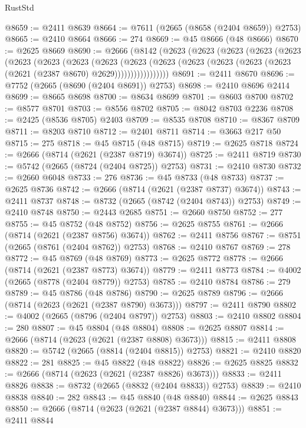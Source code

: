 \begin{lexlean}{RustStd}
\begin{coremodule}
@8659 := @2411 @8639
@8664 := @7611 (@2665 (@8658 (@2404 @8659)) @2753)
@8665 := @2410 @8664
@8666 := 274
@8669 := @45 @8666 (@48 @8666)
@8670 := @2625 @8669
@8690 := @2666
    (@8142
      (@2623
        (@2623
          (@2623
            (@2623
              (@2623
                (@2623
                  (@2623
                    (@2623
                      (@2623
                        (@2623
                          (@2623
                            (@2623 (@2623 (@2623 (@2623 (@2621 (@2387 @8670) @2629)))))))))))))))))
@8691 := @2411 @8670
@8696 := @7752 (@2665 (@8690 (@2404 @8691)) @2753)
@8698 := @2410 @8696 @2414
@8699 := @8665 @8698
@8700 := @8634 @8699
@8701 := @8603 @8700
@8702 := @8577 @8701
@8703 := @8556 @8702
@8705 := @8042 @8703 @2236
@8708 := @2425 (@8536 @8705) @2403
@8709 := @8535 @8708
@8710 := @8367 @8709
@8711 := @8203 @8710
@8712 := @2401 @8711
@8714 := @3663 @217 @50
@8715 := 275
@8718 := @45 @8715 (@48 @8715)
@8719 := @2625 @8718
@8724 := @2666 (@8714 (@2621 (@2387 @8719) @3674))
@8725 := @2411 @8719
@8730 := @5742 (@2665 (@8724 (@2404 @8725)) @2753)
@8731 := @2410 @8730
@8732 := @2660 @6048
@8733 := 276
@8736 := @45 @8733 (@48 @8733)
@8737 := @2625 @8736
@8742 := @2666 (@8714 (@2621 (@2387 @8737) @3674))
@8743 := @2411 @8737
@8748 := @8732 (@2665 (@8742 (@2404 @8743)) @2753)
@8749 := @2410 @8748
@8750 := @2443 @2685
@8751 := @2660 @8750
@8752 := 277
@8755 := @45 @8752 (@48 @8752)
@8756 := @2625 @8755
@8761 := @2666 (@8714 (@2621 (@2387 @8756) @3674))
@8762 := @2411 @8756
@8767 := @8751 (@2665 (@8761 (@2404 @8762)) @2753)
@8768 := @2410 @8767
@8769 := 278
@8772 := @45 @8769 (@48 @8769)
@8773 := @2625 @8772
@8778 := @2666 (@8714 (@2621 (@2387 @8773) @3674))
@8779 := @2411 @8773
@8784 := @4002 (@2665 (@8778 (@2404 @8779)) @2753)
@8785 := @2410 @8784
@8786 := 279
@8789 := @45 @8786 (@48 @8786)
@8790 := @2625 @8789
@8796 := @2666 (@8714 (@2623 (@2621 (@2387 @8790) @3673)))
@8797 := @2411 @8790
@8802 := @4002 (@2665 (@8796 (@2404 @8797)) @2753)
@8803 := @2410 @8802
@8804 := 280
@8807 := @45 @8804 (@48 @8804)
@8808 := @2625 @8807
@8814 := @2666 (@8714 (@2623 (@2621 (@2387 @8808) @3673)))
@8815 := @2411 @8808
@8820 := @5742 (@2665 (@8814 (@2404 @8815)) @2753)
@8821 := @2410 @8820
@8822 := 281
@8825 := @45 @8822 (@48 @8822)
@8826 := @2625 @8825
@8832 := @2666 (@8714 (@2623 (@2621 (@2387 @8826) @3673)))
@8833 := @2411 @8826
@8838 := @8732 (@2665 (@8832 (@2404 @8833)) @2753)
@8839 := @2410 @8838
@8840 := 282
@8843 := @45 @8840 (@48 @8840)
@8844 := @2625 @8843
@8850 := @2666 (@8714 (@2623 (@2621 (@2387 @8844) @3673)))
@8851 := @2411 @8844

\end{coremodule}
\end{lexlean}
